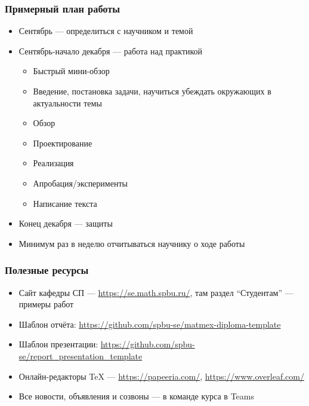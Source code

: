 \documentclass{../../slides-style}
\begin{document}
    \begin{frame}
        \frametitle{Примерный план работы}
        \begin{itemize}
            \item Сентябрь --- определиться с научником и темой
            \item Сентябрь-начало декабря --- работа над практикой
            \begin{itemize}
                \item Быстрый мини-обзор
                \item Введение, постановка задачи, научиться убеждать окружающих в актуальности темы
                \item Обзор
                \item Проектирование
                \item Реализация
                \item Апробация/эксперименты
                \item Написание текста
            \end{itemize}
            \item Конец декабря --- защиты
            \item Минимум раз в неделю отчитываться научнику о ходе работы
        \end{itemize}
    \end{frame}

    \begin{frame}
        \frametitle{Полезные ресурсы}
        \begin{itemize}
            \item Сайт кафедры СП --- \url{https://se.math.spbu.ru/}, там раздел ``Студентам'' --- примеры работ
            \item Шаблон отчёта: \url{https://github.com/spbu-se/matmex-diploma-template}
            \item Шаблон презентации: \url{https://github.com/spbu-se/report_presentation_template}
            \item Онлайн-редакторы TeX --- \url{https://papeeria.com/}, \url{https://www.overleaf.com/}
            \item Все новости, объявления и созвоны --- в команде курса в Teams
        \end{itemize}
    \end{frame}
\end{document}
